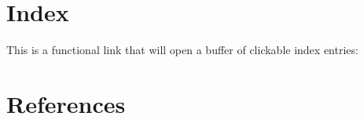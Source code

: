 \documentclass[11pt]{article}
\begin{document}
\section{Index}
\label{sec:orgcf64225}

This is a functional link that will open a buffer of clickable index entries:

\renewcommand{\indexname}{}
\printindex

\section{References}
\label{sec:orgbd17597}

\label{bibliographystyle link}


\label{bibliography link}

\end{document}
